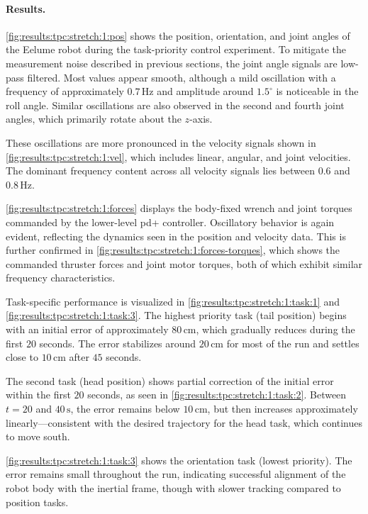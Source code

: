 \fi

\paragraph{Results.}

\autoref{fig:results:tpc:stretch:1:pos} shows the position, orientation, and joint angles of the Eelume robot during the task-priority control experiment. To mitigate the measurement noise described in previous sections, the joint angle signals are low-pass filtered. Most values appear smooth, although a mild oscillation with a frequency of approximately \(0.7\,\mathrm{Hz}\) and amplitude around \(1.5^\circ\) is noticeable in the roll angle. Similar oscillations are also observed in the second and fourth joint angles, which primarily rotate about the \(z\)-axis.

These oscillations are more pronounced in the velocity signals shown in \autoref{fig:results:tpc:stretch:1:vel}, which includes linear, angular, and joint velocities. The dominant frequency content across all velocity signals lies between \(0.6\) and \(0.8\,\mathrm{Hz}\).

\autoref{fig:results:tpc:stretch:1:forces} displays the body-fixed wrench and joint torques commanded by the lower-level \gls{pd+} controller. Oscillatory behavior is again evident, reflecting the dynamics seen in the position and velocity data. This is further confirmed in \autoref{fig:results:tpc:stretch:1:forces-torques}, which shows the commanded thruster forces and joint motor torques, both of which exhibit similar frequency characteristics.

Task-specific performance is visualized in \autoref{fig:results:tpc:stretch:1:task:1} and \ref{fig:results:tpc:stretch:1:task:3}. The highest priority task (tail position) begins with an initial error of approximately \(80\,\mathrm{cm}\), which gradually reduces during the first \(20\) seconds. The error stabilizes around \(20\,\mathrm{cm}\) for most of the run and settles close to \(10\,\mathrm{cm}\) after \(45\) seconds.

The second task (head position) shows partial correction of the initial error within the first \(20\) seconds, as seen in \autoref{fig:results:tpc:stretch:1:task:2}. Between \(t = 20\) and \(40\,\mathrm{s}\), the error remains below \(10\,\mathrm{cm}\), but then increases approximately linearly—consistent with the desired trajectory for the head task, which continues to move south.

\autoref{fig:results:tpc:stretch:1:task:3} shows the orientation task (lowest priority). The error remains small throughout the run, indicating successful alignment of the robot body with the inertial frame, though with slower tracking compared to position tasks.

